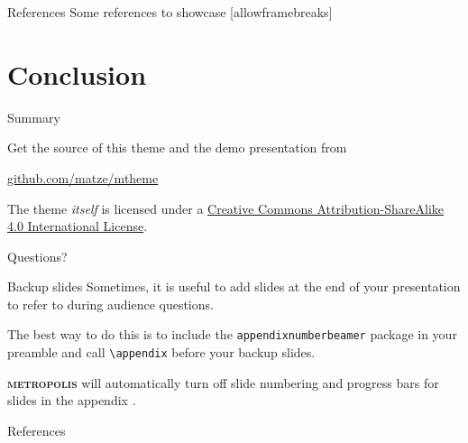 \documentclass[10pt]{beamer}
\newcommand{\themename}{\textbf{\textsc{metropolis}}\xspace}
\begin{document}
\begin{frame}{References}
    Some references to showcase [allowframebreaks] \cite{knuth92,ConcreteMath,Simpson,Er01,greenwade93}
\end{frame}

\section{Conclusion}

\begin{frame}{Summary}

    Get the source of this theme and the demo presentation from

    \begin{center}\url{github.com/matze/mtheme}\end{center}

    The theme \emph{itself} is licensed under a
    \href{http://creativecommons.org/licenses/by-sa/4.0/}{Creative Commons
    Attribution-ShareAlike 4.0 International License}.

    \begin{center}\ccbysa\end{center}

\end{frame}

{
\begin{frame}[standout]
    Questions?
\end{frame}
}

\appendix

\begin{frame}[fragile]{Backup slides}
    Sometimes, it is useful to add slides at the end of your presentation to
    refer to during audience questions.

    The best way to do this is to include the \verb|appendixnumberbeamer|
    package in your preamble and call \verb|\appendix| before your backup slides.

    \themename will automatically turn off slide numbering and progress bars for
    slides in the appendix \cite{Rosa2016}.
\end{frame}

\begin{frame}[allowframebreaks]{References}

    

\end{frame}
\end{document}
